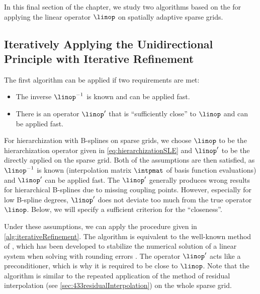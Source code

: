 \label{sec:45spatAdaptiveUP}

In this final section of the chapter,
we study two algorithms based on the \up
for applying the linear operator $\linop$ on spatially adaptive sparse grids.



\subsection{%
  Iteratively Applying the Unidirectional Principle with Iterative Refinement%
}
\label{sec:451iterativeRefinement}

The first algorithm can be applied if two requirements are met:
\begin{itemize}
  \item
  The inverse $\linop^{-1}$ is known and can be applied fast.
  
  \item
  There is an operator $\linop'$
  that is ``sufficiently close'' to $\linop$ and can be applied fast.
\end{itemize}
For hierarchization with B-splines on sparse grids,
we choose $\linop$ to be the hierarchization
operator given in \cref{eq:hierarchizationSLE} and
$\linop'$ to be the \up directly applied on the
sparse grid.
Both of the assumptions are then satisfied,
as $\linop^{-1}$ is known
(interpolation matrix $\intpmat$ of basis function evaluations)
and $\linop'$ can be applied fast.
The \up $\linop'$ generally produces wrong
results for hierarchical B-splines due to missing coupling points.
However, especially for low B-spline degrees,
$\linop'$ does not deviate too much from the true operator $\linop$.
Below, we will specify a sufficient criterion for the ``closeness''.

Under these assumptions, we can apply the procedure given in
\cref{alg:iterativeRefinement}.
The algorithm is equivalent to the well-known method of
, which has been developed to
stabilize the numerical solution of a linear system when solving
with rounding errors \cite{Higham02Accuracy}.
The operator $\linop'$ acts like a preconditioner,
which is why it is required to be close to $\linop$.
Note that the algorithm is similar to the repeated application
of the method of residual interpolation
(see \cref{sec:433residualInterpolation}) on the whole sparse grid.

